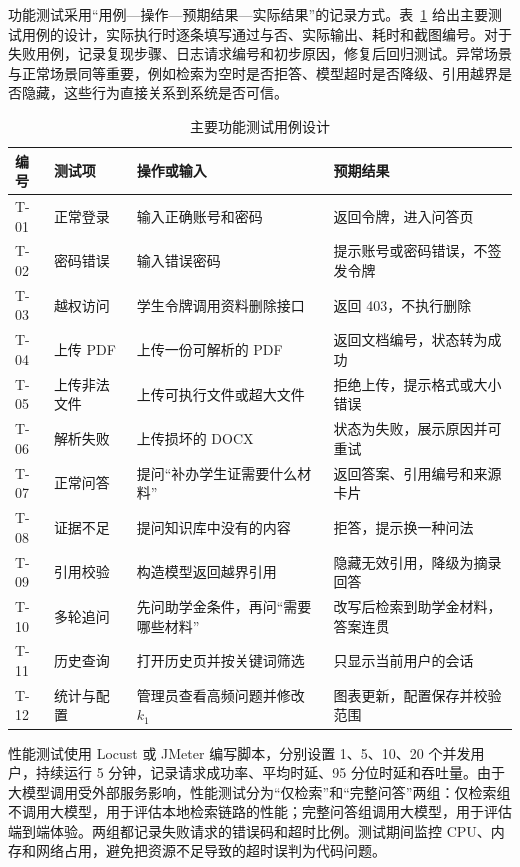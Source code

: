 功能测试采用“用例—操作—预期结果—实际结果”的记录方式。表~\ref{tab:test-case} 给出主要测试用例的设计，实际执行时逐条填写通过与否、实际输出、耗时和截图编号。对于失败用例，记录复现步骤、日志请求编号和初步原因，修复后回归测试。异常场景与正常场景同等重要，例如检索为空时是否拒答、模型超时是否降级、引用越界是否隐藏，这些行为直接关系到系统是否可信。

\begin{table}[H]
  \centering
  \caption{主要功能测试用例设计}
  \label{tab:test-case}
  \renewcommand{\arraystretch}{1.05}
  \begin{tabular}{p{1.1cm}p{3.0cm}p{5.5cm}p{3.3cm}}
    \toprule
    编号 & 测试项 & 操作或输入 & 预期结果 \\
    \midrule
    T-01 & 正常登录 & 输入正确账号和密码 & 返回令牌，进入问答页 \\
    T-02 & 密码错误 & 输入错误密码 & 提示账号或密码错误，不签发令牌 \\
    T-03 & 越权访问 & 学生令牌调用资料删除接口 & 返回 403，不执行删除 \\
    T-04 & 上传 PDF & 上传一份可解析的 PDF & 返回文档编号，状态转为成功 \\
    T-05 & 上传非法文件 & 上传可执行文件或超大文件 & 拒绝上传，提示格式或大小错误 \\
    T-06 & 解析失败 & 上传损坏的 DOCX & 状态为失败，展示原因并可重试 \\
    T-07 & 正常问答 & 提问“补办学生证需要什么材料” & 返回答案、引用编号和来源卡片 \\
    T-08 & 证据不足 & 提问知识库中没有的内容 & 拒答，提示换一种问法 \\
    T-09 & 引用校验 & 构造模型返回越界引用 & 隐藏无效引用，降级为摘录回答 \\
    T-10 & 多轮追问 & 先问助学金条件，再问“需要哪些材料” & 改写后检索到助学金材料，答案连贯 \\
    T-11 & 历史查询 & 打开历史页并按关键词筛选 & 只显示当前用户的会话 \\
    T-12 & 统计与配置 & 管理员查看高频问题并修改 $k_1$ & 图表更新，配置保存并校验范围 \\
    \bottomrule
  \end{tabular}
\end{table}

性能测试使用 Locust 或 JMeter 编写脚本，分别设置 1、5、10、20 个并发用户，持续运行 5 分钟，记录请求成功率、平均时延、95 分位时延和吞吐量。由于大模型调用受外部服务影响，性能测试分为“仅检索”和“完整问答”两组：仅检索组不调用大模型，用于评估本地检索链路的性能；完整问答组调用大模型，用于评估端到端体验。两组都记录失败请求的错误码和超时比例。测试期间监控 CPU、内存和网络占用，避免把资源不足导致的超时误判为代码问题。

